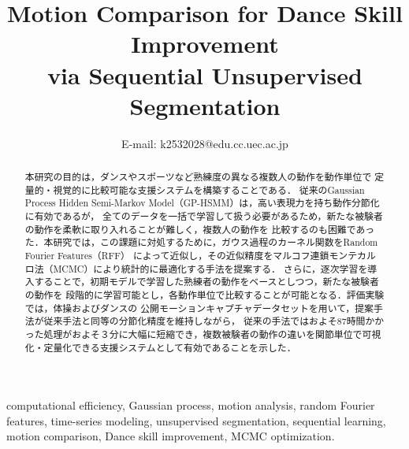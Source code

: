 \documentclass[conference]{IEEEtran}
\begin{document}
\title{Motion Comparison for Dance Skill Improvement \\via Sequential Unsupervised Segmentation}

\author{
E-mail: k2532028@edu.cc.uec.ac.jp}


\maketitle

\begin{abstract}
本研究の目的は，ダンスやスポーツなど熟練度の異なる複数人の動作を動作単位で
定量的・視覚的に比較可能な支援システムを構築することである．
従来のGaussian Process Hidden Semi-Markov Model（GP-HSMM）は，高い表現力を持ち動作分節化に有効であるが，
全てのデータを一括で学習して扱う必要があるため，新たな被験者の動作を柔軟に取り入れることが難しく，複数人の動作を
比較するのも困難であった．本研究では，この課題に対処するために，ガウス過程のカーネル関数をRandom Fourier Features（RFF）
によって近似し，その近似精度をマルコフ連鎖モンテカルロ法（MCMC）により統計的に最適化する手法を提案する．
さらに，逐次学習を導入することで，初期モデルで学習した熟練者の動作をベースとしつつ，新たな被験者の動作を
段階的に学習可能とし，各動作単位で比較することが可能となる．評価実験では，体操およびダンスの
公開モーションキャプチャデータセットを用いて，提案手法が従来手法と同等の分節化精度を維持しながら，
従来の手法ではおよそ87時間かかった処理がおよそ３分に大幅に短縮でき，複数被験者の動作の違いを関節単位で可視化・定量化できる支援システムとして有効であることを示した．
\end{abstract}

\begin{IEEEkeywords}
computational efficiency, Gaussian process, motion analysis, random Fourier features, time-series modeling, unsupervised segmentation, sequential learning, motion comparison, Dance skill improvement, MCMC optimization.
\end{IEEEkeywords}
\end{document}
